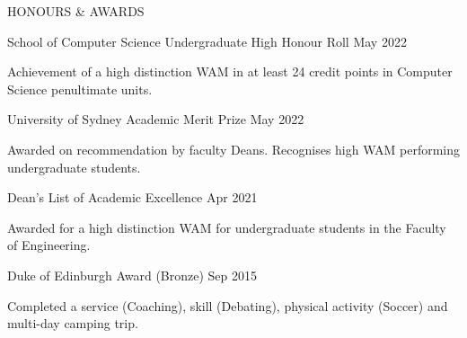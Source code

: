 
\begin{ResumeSection}{HONOURS \& AWARDS} 
    
    \begin{DatedField}
        {School of Computer Science Undergraduate High Honour Roll}
        {May 2022}
        {}
        {}
        \item Achievement of a high distinction WAM in at least 24 credit points in Computer Science penultimate units.
    \end{DatedField}

    \vspace{-0.75em}
    
    \begin{DatedField}
        {University of Sydney Academic Merit Prize}
        {May 2022}
        {}
        {}
        \item Awarded on recommendation by faculty Deans. Recognises high WAM performing undergraduate students.
    \end{DatedField}

    \vspace{-0.75em}
    
    \begin{DatedField}
        {Dean's List of Academic Excellence}
        {Apr 2021}
        {}
        {}
        \item Awarded for a high distinction WAM for undergraduate students in the Faculty of Engineering.
    \end{DatedField}

    \vspace{-0.75em}
    
    \begin{DatedField}
        {Duke of Edinburgh Award (Bronze)}
        {Sep 2015}
        {}
        {}
        \item Completed a service (Coaching), skill (Debating), physical activity (Soccer) and multi-day camping trip.
    \end{DatedField}
    
\end{ResumeSection}